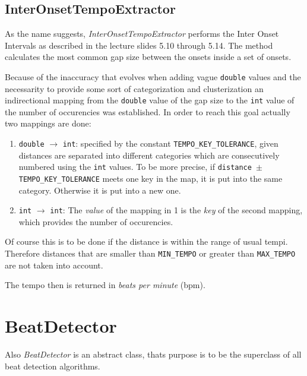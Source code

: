 \subsection{\ttfamily InterOnsetTempoExtractor} \label{ssec:tempointeronset}
As the name suggests, \emph{InterOnsetTempoExtractor} performs the Inter Onset
Intervals as described in the lecture slides 5.10 through 5.14. The method
calculates the most common gap size between the onsets inside a set of onsets. 

Because of the inaccuracy that evolves when adding vague \texttt{double}
values and the necessarity to provide some sort of categorization and
clusterization an indirectional mapping from the \texttt{double} value of the
gap size to the \texttt{int} value of the number of occurencies was established.
In order to reach this goal actually two mappings are done:

\begin{enumerate}
  \item \texttt{double} $\rightarrow$ \texttt{int}: specified by the constant
  \texttt{TEMPO\_KEY\_TOLERANCE}, given distances are separated into different
  categories which are consecutively numbered using the \texttt{int} values. To
  be more precise, if \texttt{distance $\pm$ TEMPO\_KEY\_TOLERANCE}
  meets one key in the map, it is put into the same category. Otherwise it is
  put into a new one.
  \item \texttt{int} $\rightarrow$ \texttt{int}: The \emph{value} of the
  mapping in 1 is the \emph{key} of the second mapping, which provides the
  number of occurencies.
\end{enumerate}

Of course this is to be done if the distance is within the range of usual tempi.
Therefore distances that are smaller than \texttt{MIN\_TEMPO} or greater than
\texttt{MAX\_TEMPO} are not taken into account.

The tempo then is returned in \emph{beats per minute} (bpm).

\section{\ttfamily BeatDetector} \label{sec:beat}
Also \emph{BeatDetector} is an abstract class, thats purpose is to be the
superclass of all beat detection algorithms. 


